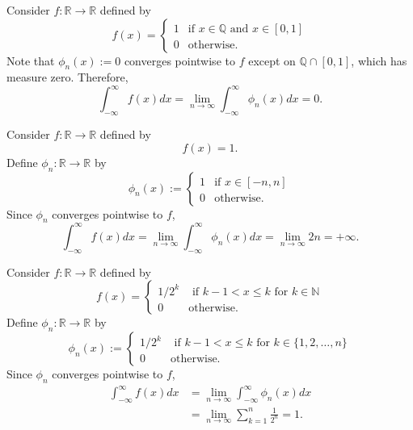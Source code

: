 
\begin{exmp}{}{}
  Consider \(f \colon \mathbb{R} \to \mathbb{R}\) defined by \[
    f(x) =
	\begin{cases}
	  1 & \text{if }x \in \mathbb{Q}\text{ and }x \in [0, 1]\\
	  0 & \text{otherwise.}
	\end{cases}
  \] 
  Note that \(\phi_n(x) := 0\) converges pointwise to \(f\) except on \(\mathbb{Q}\cap[0, 1]\), which has measure zero. Therefore, \[
    \int_{-\infty}^\infty f(x)dx = \lim_{n\to\infty} \int_{-\infty}^\infty \phi_n(x)dx = 0.
  \] 
\end{exmp}

\begin{exmp}{}{}
  Consider \(f\colon \mathbb{R} \to \mathbb{R}\) defined by  \[
    f(x) = 1.
  \] 
  Define \(\phi_n\colon \mathbb{R} \to \mathbb{R}\) by \[\phi_n(x) :=
  \begin{cases}
	1 & \text{if }x \in [-n, n]\\
	0 & \text{otherwise.}
  \end{cases}\]
  Since \(\phi_n\) converges pointwise to \(f\),
  \[
    \int_{-\infty}^\infty f(x)dx = \lim_{n\to\infty} \int_{-\infty}^\infty \phi_n(x)dx = \lim_{n \to \infty} 2n = +\infty.
  \] 
\end{exmp}

\begin{exmp}{}{}
  Consider \(f \colon \mathbb{R} \to \mathbb{R}\) defined by \[
    f(x) =
	\begin{cases}
	  1/2^k & \text{ if } k - 1 < x \leq k \text{ for }k \in \mathbb{N} \\
	  0 & \text{otherwise.}
	\end{cases}
  \] 
  Define \(\phi_n\colon \mathbb{R} \to \mathbb{R}\) by \[\phi_n(x) :=
	\begin{cases}
	  1/2^k & \text{ if } k - 1 < x \leq k \text{ for }k \in \{1, 2, \dots, n\} \\
	  0 & \text{otherwise.}
	\end{cases}
  \]
  Since \(\phi_n\) converges pointwise to \(f\), \begin{align*}
	\int_{-\infty}^\infty f(x)dx &= \lim_{n\to\infty} \int_{-\infty}^\infty \phi_n(x)dx \\
								 &= \lim_{n\to\infty} \sum_{k=1}^n \frac{1}{2^n} = 1.
  \end{align*}
\end{exmp}

